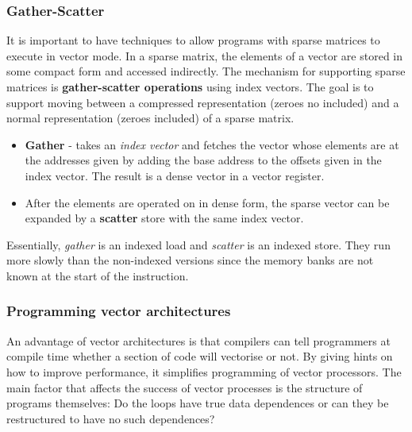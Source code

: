 \documentclass[11pt]{article}
\begin{document}
\subsubsection{Gather-Scatter}
It is important to have techniques to allow programs with sparse matrices to execute in vector mode. In a sparse matrix, the elements of a vector are stored in some compact form and accessed indirectly. 
\n
The mechanism for supporting sparse matrices is \textbf{gather-scatter operations} using index vectors. The goal is to support moving between a compressed representation (zeroes no included) and a normal representation (zeroes included) of a sparse matrix. 
\begin{itemize}
\item \textbf{Gather} - takes an \textit{index vector} and fetches the vector whose elements are at the addresses given by adding the base address to the offsets given in the index vector. The result is a dense vector in a vector register. 
\item After the elements are operated on in dense form, the sparse vector can be expanded by a \textbf{scatter} store with the same index vector. 
\end{itemize}
Essentially, \textit{gather} is an indexed load and \textit{scatter} is an indexed store. They run more slowly than the non-indexed versions since the memory banks are not known at the start of the instruction. 
\subsubsection{Programming vector architectures}
An advantage of vector architectures is that compilers can tell programmers at compile time whether a section of code will vectorise or not. By giving hints on how to improve performance, it simplifies programming of vector processors. 
\n
The main factor that affects the success of vector processes is the structure of programs themselves: Do the loops have true data dependences or can they be restructured to have no such dependences?
\end{document}
